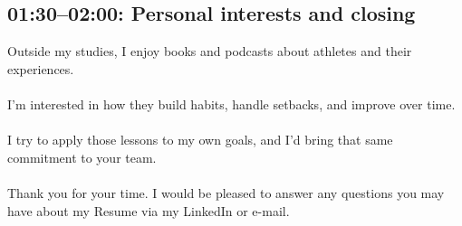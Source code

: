 \documentclass{article}
\begin{document}
\subsection*{01:30--02:00: Personal interests and closing}

Outside my studies, I enjoy books and podcasts about athletes and their experiences. 
\\
\\
I'm interested in how they build habits, handle setbacks, and improve over time.
\\
\\
I try to apply those lessons to my own goals, and I'd bring that same commitment to your team.
\\
\\
Thank you for your time. I would be pleased to answer any questions you may have about my Resume via my LinkedIn or e-mail.
\end{document}
